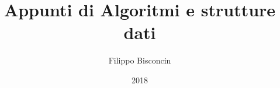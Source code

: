 \documentclass[11pt,a4paper,twoside,openright]{book}
\title{Appunti di Algoritmi e strutture dati}
\author{Filippo Bisconcin}
\date{2018}
\begin{document}
\frontmatter

\begin{titlepage}
\maketitle
\end{titlepage}

\pagestyle{plain}
\tableofcontents
\pagestyle{empty}\cleardoublepage
{}

\pagestyle{fancy} 
\fancyfoot{}                                               
\renewcommand{\chaptermark}[1]{\markboth{\chaptername\ \thechapter.\ #1}{}} 
\renewcommand{\sectionmark}[1]{\markright{\thesection.\ #1}}         
\fancyhead[LE,RO]{\bfseries\thepage}    
                                        
\fancyhead[RE]{\bfseries\leftmark}    
\fancyhead[LO]{\bfseries\rightmark}     
\renewcommand{\headrulewidth}{0.3pt} 

\mainmatter






























\backmatter
\end{document}
